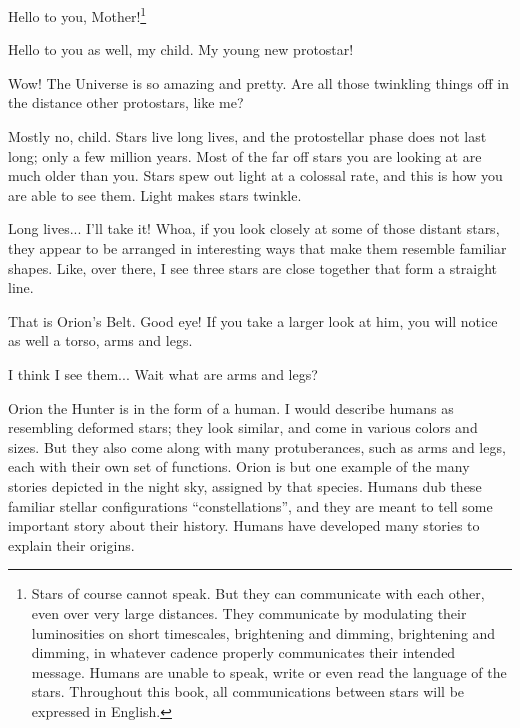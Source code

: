\documentclass[main.tex]{subfiles}
\begin{document}
\par \Maia Hello to you, Mother!\footnote{Stars of course cannot speak.  But they can communicate with each other, even over very large distances.  They communicate by modulating their luminosities on short timescales, brightening and dimming, brightening and dimming, in whatever cadence properly communicates their intended message.  Humans are unable to speak, write or even read the language of the stars.  Throughout this book, all communications between stars will be expressed in English.} 

\par \Pleione Hello to you as well, my child.  My young new protostar!

\par \Maia Wow!  The Universe is so amazing and pretty.  Are all those twinkling things off in the distance other protostars, like me?

\par \Pleione Mostly no, child.  Stars live long lives, and the protostellar phase does not last long; only a few million years.  Most of the far off stars you are looking at are much older than you.  Stars spew out light at a colossal rate, and this is how you are able to see them.  Light makes stars twinkle.

\par \Maia Long lives...  I'll take it!  Whoa, if you look closely at some of those distant stars, they appear to be arranged in interesting ways that make them resemble familiar shapes.  Like, over there, I see three stars are close together that form a straight line.

\par \Pleione That is Orion's Belt.  Good eye!  If you take a larger look at him, you will notice as well a torso, arms and legs.  

\par \Maia I think I see them... Wait what are arms and legs?  

\par \Pleione Orion the Hunter is in the form of a human.  I would describe humans as resembling deformed stars; they look similar, and come in various colors and sizes.  But they also come along with many protuberances, such as arms and legs, each with their own set of functions.   Orion is but one example of the many stories depicted in the night sky, assigned by that species.  Humans dub these familiar stellar configurations ``constellations'', and they are meant to tell some important story about their history.  Humans have developed many stories to explain their origins.
\end{document}
